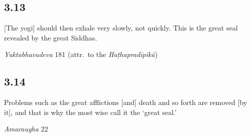 \begin{ekdosis}
\begin{philcomm}[hp03_012]
\end{philcomm}

\subsection*{3.13}
\begin{translation}[hp03_013]
{[}The yogi] should then exhale very slowly, not quickly. This is the great seal revealed by the great Siddhas.
\end{translation}


\begin{testimonia}[hp03_013]
\emph{Yuktabhavadeva} 181 (attr.~to the \emph{Haṭhapradīpikā})
\begin{versinnote}
\end{versinnote}
\end{testimonia}


\subsection*{3.14}
\begin{translation}[hp03_014]
Problems such as the great afflictions [and] death and so forth are removed [by it], and that is why the most wise call it the `great seal.'
\end{translation}

\begin{sources}[hp03_014]
\emph{Amaraugha} 22
\begin{versinnote}
\tl{\var{mahākleśādayo doṣā ] mahārogā mahākleśā \vl}\\+}
\tl{\var{bhidyante ] jīryante \vl}\\!}
\end{versinnote}
\end{sources}


\end{ekdosis}
